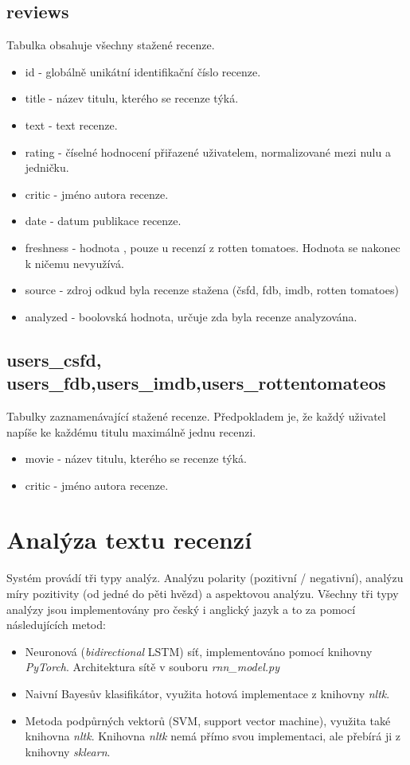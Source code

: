 \subsection{reviews}
Tabulka obsahuje všechny stažené recenze.
\begin{itemize}
    \item id - globálně unikátní identifikační číslo recenze. 
    \item title - název titulu, kterého se recenze týká.
    \item text - text recenze.
    \item rating - číselné hodnocení přiřazené uživatelem, normalizované mezi nulu a jedničku.
    \item critic - jméno autora recenze.
    \item date - datum publikace recenze.
    \item freshness - hodnota , pouze u recenzí z rotten tomatoes. Hodnota se nakonec k ničemu nevyužívá.
    \item source - zdroj odkud byla recenze stažena (čsfd, fdb, imdb, rotten tomatoes)
    \item analyzed - boolovská hodnota, určuje zda byla recenze analyzována.
\end{itemize}

\subsection{users\_csfd, users\_fdb,users\_imdb,users\_rottentomateos}
Tabulky zaznamenávající stažené recenze. Předpokladem je, že každý uživatel napíše ke každému titulu maximálně jednu recenzi.
\begin{itemize}
    \item movie - název titulu, kterého se recenze týká.
    \item critic - jméno autora recenze.
\end{itemize}
 



\section{Analýza textu recenzí}
Systém provádí tři typy analýz. Analýzu polarity (pozitivní / negativní), analýzu míry pozitivity (od jedné do pěti hvězd) a aspektovou analýzu. Všechny tři typy analýzy jsou implementovány pro český i anglický jazyk a to za pomocí následujících metod:

\begin{itemize}
  \item Neuronová (\emph{bidirectional} LSTM) síť, implementováno pomocí knihovny \emph{PyTorch}. Architektura sítě v souboru \emph{rnn\_model.py}
  \item Naivní Bayesův klasifikátor, využita hotová implementace z knihovny \emph{nltk}.
  \item Metoda podpůrných vektorů  (SVM, support vector machine), využita také knihovna \emph{nltk}. Knihovna \emph{nltk} nemá přímo svou implementaci, ale přebírá ji z knihovny \emph{sklearn}.
\end{itemize}


